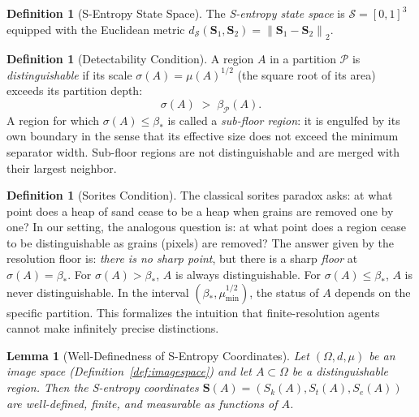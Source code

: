 \documentclass[twocolumn]{article}
\theoremstyle{plain}
\newtheorem{lemma}[theorem]{Lemma}
\theoremstyle{definition}
\newtheorem{definition}[theorem]{Definition}
\newcommand{\PP}{\mathcal{P}}
\newcommand{\ScS}{\mathcal{S}}
\newcommand{\Sk}{S_k}
\newcommand{\St}{S_t}
\newcommand{\Se}{S_e}
\newcommand{\bS}{\mathbf{S}}
\newcommand{\dS}{d_{\mathcal{S}}}
\newcommand{\partdep}{\beta_{\PP}}
\newcommand{\bstar}{\beta_*}
\newcommand{\mumin}{\mu_{\min}}
\newcommand{\norm}[1]{\left\lVert #1 \right\rVert}
\begin{document}
\begin{definition}[S-Entropy State Space]
\label{def:statespace}
The \emph{S-entropy state space} is $\ScS = [0,1]^3$ equipped with the Euclidean
metric $\dS(\bS_1, \bS_2) = \norm{\bS_1 - \bS_2}_2$.
\end{definition}

\begin{definition}[Detectability Condition]
\label{def:detect}
A region $A$ in a partition $\PP$ is \emph{distinguishable} if its scale
$\sigma(A) = \mu(A)^{1/2}$ (the square root of its area) exceeds its partition
depth:
\[
  \sigma(A) \;>\; \partdep(A).
\]
A region for which $\sigma(A) \leq \bstar$ is called a \emph{sub-floor region}:
it is engulfed by its own boundary in the sense that its effective size does not
exceed the minimum separator width. Sub-floor regions are not distinguishable and
are merged with their largest neighbor.
\end{definition}

\begin{definition}[Sorites Condition]
\label{def:sorites}
The classical sorites paradox asks: at what point does a heap of sand cease to
be a heap when grains are removed one by one? In our setting, the analogous
question is: at what point does a region cease to be distinguishable as grains
(pixels) are removed? The answer given by the resolution floor is:
\emph{there is no sharp point}, but there is a sharp \emph{floor} at $\sigma(A)
= \bstar$. For $\sigma(A) > \bstar$, $A$ is always distinguishable. For
$\sigma(A) \leq \bstar$, $A$ is never distinguishable. In the interval
$(\bstar, \mumin^{1/2})$, the status of $A$ depends on the specific partition.
This formalizes the intuition that finite-resolution agents cannot make
infinitely precise distinctions.
\end{definition}

\begin{lemma}[Well-Definedness of S-Entropy Coordinates]
\label{lem:welldefined}
Let $(\Omega, d, \mu)$ be an image space (Definition~\ref{def:imagespace}) and
let $A \subset \Omega$ be a distinguishable region. Then the S-entropy coordinates
$\bS(A) = (\Sk(A), \St(A), \Se(A))$ are well-defined, finite, and measurable
as functions of $A$.
\end{lemma}
\end{document}
